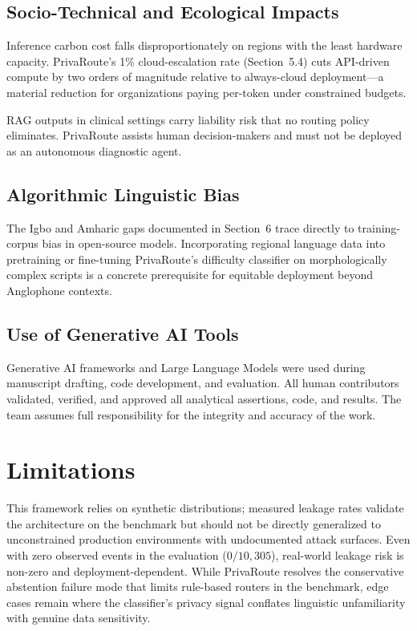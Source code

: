 \documentclass{article}
\begin{document}
\subsection{Socio-Technical and Ecological Impacts}
Inference carbon cost falls disproportionately on regions with the least hardware capacity. PrivaRoute's 1\% cloud-escalation rate (Section~5.4) cuts API-driven compute by two orders of magnitude relative to always-cloud deployment---a material reduction for organizations paying per-token under constrained budgets.

RAG outputs in clinical settings carry liability risk that no routing policy eliminates. PrivaRoute assists human decision-makers and must not be deployed as an autonomous diagnostic agent.

\subsection{Algorithmic Linguistic Bias}
The Igbo and Amharic gaps documented in Section~6 trace directly to training-corpus bias in open-source models. Incorporating regional language data into pretraining or fine-tuning PrivaRoute's difficulty classifier on morphologically complex scripts is a concrete prerequisite for equitable deployment beyond Anglophone contexts.

\subsection{Use of Generative AI Tools}
Generative AI frameworks and Large Language Models were used during manuscript drafting, code development, and evaluation. All human contributors validated, verified, and approved all analytical assertions, code, and results. The team assumes full responsibility for the integrity and accuracy of the work.

\section{Limitations}
\label{sec:limitations}

This framework relies on synthetic distributions; measured leakage rates validate the architecture on the benchmark but should not be directly generalized to unconstrained production environments with undocumented attack surfaces. Even with zero observed events in the evaluation ($0/10{,}305$), real-world leakage risk is non-zero and deployment-dependent. While PrivaRoute resolves the conservative abstention failure mode that limits rule-based routers in the benchmark, edge cases remain where the classifier's privacy signal conflates linguistic unfamiliarity with genuine data sensitivity.
\end{document}

